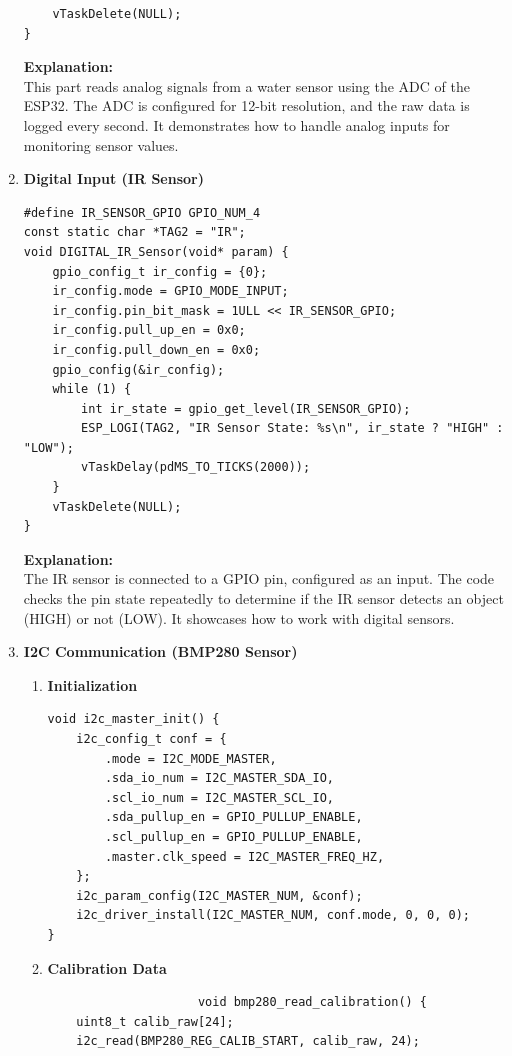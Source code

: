 \begin{enumerate}
\begin{lstlisting}
    vTaskDelete(NULL);
}
             \end{lstlisting}
             \textbf{Explanation:}\\
             This part reads analog signals from a water sensor using the ADC of the ESP32. The ADC is configured for 12-bit resolution, and the raw data is logged every second. It demonstrates how to handle analog inputs for monitoring sensor values.
             \item \textbf{Digital Input (IR Sensor)}
             \begin{lstlisting}
#define IR_SENSOR_GPIO GPIO_NUM_4
const static char *TAG2 = "IR";
void DIGITAL_IR_Sensor(void* param) {
    gpio_config_t ir_config = {0};
    ir_config.mode = GPIO_MODE_INPUT;
    ir_config.pin_bit_mask = 1ULL << IR_SENSOR_GPIO;
    ir_config.pull_up_en = 0x0;
    ir_config.pull_down_en = 0x0;
    gpio_config(&ir_config);
    while (1) {
        int ir_state = gpio_get_level(IR_SENSOR_GPIO);
        ESP_LOGI(TAG2, "IR Sensor State: %s\n", ir_state ? "HIGH" : "LOW");
        vTaskDelay(pdMS_TO_TICKS(2000));
    }
    vTaskDelete(NULL);
}
             \end{lstlisting}
             \textbf{Explanation:}\\
             The IR sensor is connected to a GPIO pin, configured as an input. The code checks the pin state repeatedly to determine if the IR sensor detects an object (HIGH) or not (LOW). It showcases how to work with digital sensors.
             \item \textbf{I2C Communication (BMP280 Sensor)}
             \begin{enumerate}
                 \item \textbf{Initialization}
                 \begin{lstlisting}
void i2c_master_init() {
    i2c_config_t conf = {
        .mode = I2C_MODE_MASTER,
        .sda_io_num = I2C_MASTER_SDA_IO,
        .scl_io_num = I2C_MASTER_SCL_IO,
        .sda_pullup_en = GPIO_PULLUP_ENABLE,
        .scl_pullup_en = GPIO_PULLUP_ENABLE,
        .master.clk_speed = I2C_MASTER_FREQ_HZ,
    };
    i2c_param_config(I2C_MASTER_NUM, &conf);
    i2c_driver_install(I2C_MASTER_NUM, conf.mode, 0, 0, 0);
}
                 \end{lstlisting}
                 \item \textbf{Calibration Data}
                 \begin{lstlisting}
                     void bmp280_read_calibration() {
    uint8_t calib_raw[24];
    i2c_read(BMP280_REG_CALIB_START, calib_raw, 24);

\end{lstlisting}
\end{enumerate}
\end{enumerate}
